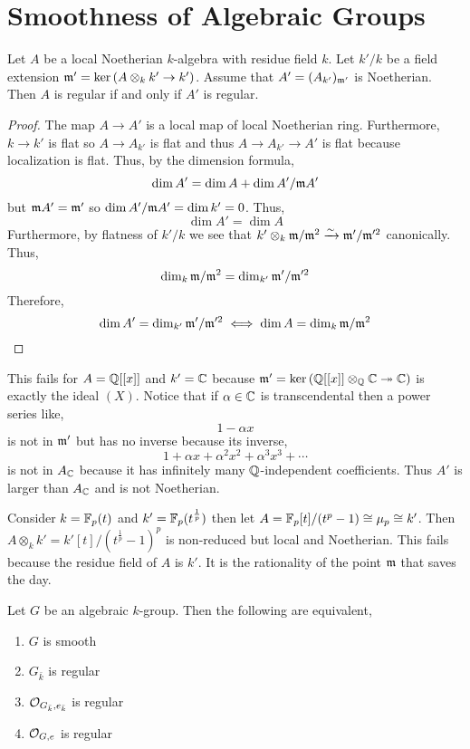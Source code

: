 \documentclass[12pt]{article}
\begin{document}
\section{Smoothness of Algebraic Groups}

\begin{lemma}
Let $A$ be a local Noetherian $k$-algebra with residue field $k$. Let $k'/k$ be a field extension $\mathfrak{m}' = \ker{(A \otimes_k k' \to k')}$. Assume that $A' = (A_{k'})_{\mathfrak{m}'}$ is Noetherian. Then $A$ is regular if and only if $A'$ is regular.
\end{lemma}

\begin{proof}
The map $A \to A'$ is a local map of local Noetherian ring. Furthermore, $k \to k'$ is flat so $A \to A_{k'}$ is flat and thus $A \to A_{k'} \to A'$ is flat because localization is flat. Thus, by the dimension formula,
\[ \dim{A'} = \dim{A} + \dim{A'/\mathfrak{m}A'} \]
but $\mathfrak{m} A' = \mathfrak{m}'$ so $\dim{A'/\mathfrak{m}A'} = \dim{k'} = 0$. Thus,
\[ \dim{A'} = \dim{A} \]
Furthermore, by flatness of $k'/k$ we see that $k' \otimes_k \mathfrak{m} / \mathfrak{m}^2 \xrightarrow{\sim} \mathfrak{m}' / \mathfrak{m}'^2$ canonically. Thus,
\[ \dim_k \mathfrak{m} / \mathfrak{m}^2 = \dim_{k'} \mathfrak{m}' / \mathfrak{m}'^2 \]
Therefore,
\[ \dim{A'} = \dim_{k'} \mathfrak{m}' / \mathfrak{m}'^2 \iff \dim{A} = \dim_k \mathfrak{m} / \mathfrak{m}^2 \]
\end{proof}

\begin{rmk}
This fails for $A = \mathbb{Q}[[x]]$ and $k' = \mathbb{C}$ because $\mathfrak{m}' = \ker{(\mathbb{Q}[[x]] \otimes_{\mathbb{Q}} \mathbb{C}\twoheadrightarrow\mathbb{C})}$ is exactly the ideal $(X)$. Notice that if $\alpha \in \mathbb{C}$ is transcendental then a power series like,
\[ 1 - \alpha x \]
is not in $\mathfrak{m}'$ but has no inverse because its inverse,
\[ 1 + \alpha x + \alpha^2 x^2 + \alpha^3 x^3 + \cdots \]
is not in $A_{\mathbb{C}}$ because it has infinitely many $\mathbb{Q}$-independent coefficients. Thus $A'$ is larger than $A_{\mathbb{C}}$ and is not Noetherian.
\end{rmk}

\begin{rmk}
Consider $k = \mathbb{F}_p(t)$ and $k' = \mathbb{F}_p(t^{\frac{1}{p}})$ then let $A = \mathbb{F}_p[t]/(t^p - 1) \cong \mu_p \cong k'$. Then $A \otimes_k k' = k'[t]/(t^{\frac{1}{p}} - 1)^p$ is non-reduced but local and Noetherian. This fails because the residue field of $A$ is $k'$. It is the rationality of the point $\mathfrak{m}$ that saves the day.
\end{rmk}

\begin{prop}
Let $G$ be an algebraic $k$-group. Then the following are equivalent,
\begin{enumerate}
\item $G$ is smooth
\item $G_{\bar{k}}$ is regular
\item $\mathcal{O}_{G_{\bar{k}}, e_{\bar{k}}}$ is regular
\item $\mathcal{O}_{G, e}$ is regular
\end{enumerate}
\end{prop}
\end{document}
